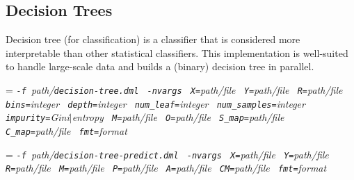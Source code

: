 \begin{comment}

 Licensed to the Apache Software Foundation (ASF) under one
 or more contributor license agreements.  See the NOTICE file
 distributed with this work for additional information
 regarding copyright ownership.  The ASF licenses this file
 to you under the Apache License, Version 2.0 (the
 "License"); you may not use this file except in compliance
 with the License.  You may obtain a copy of the License at

   http://www.apache.org/licenses/LICENSE-2.0

 Unless required by applicable law or agreed to in writing,
 software distributed under the License is distributed on an
 "AS IS" BASIS, WITHOUT WARRANTIES OR CONDITIONS OF ANY
 KIND, either express or implied.  See the License for the
 specific language governing permissions and limitations
 under the License.

\end{comment}

\subsection{Decision Trees}
\label{sec:decision_trees}

\smallskip


Decision tree (for classification) is a classifier that is considered
more interpretable than other statistical classifiers. This implementation
is well-suited to handle large-scale data and builds a (binary) decision 
tree in parallel.\\

\smallskip
{}
\smallskip

{\hangindent=\parindent\noindent\it%
	{\tt{}-f }path/\/{\tt{}decision-tree.dml}
	{\tt{} -nvargs}
	{\tt{} X=}path/file
	{\tt{} Y=}path/file
	{\tt{} R=}path/file
	{\tt{} bins=}integer
	{\tt{} depth=}integer
	{\tt{} num\_leaf=}integer
	{\tt{} num\_samples=}integer
	{\tt{} impurity=}Gini$\mid$entropy
	{\tt{} M=}path/file
	{\tt{} O=}path/file
	{\tt{} S\_map=}path/file
	{\tt{} C\_map=}path/file
	{\tt{} fmt=}format
	
}

 \smallskip
 \smallskip
 
 {\hangindent=\parindent\noindent\it%
 	{\tt{}-f }path/\/{\tt{}decision-tree-predict.dml}
 	{\tt{} -nvargs}
 	{\tt{} X=}path/file
 	{\tt{} Y=}path/file
 	{\tt{} R=}path/file
 	{\tt{} M=}path/file
 	{\tt{} P=}path/file
 	{\tt{} A=}path/file
 	{\tt{} CM=}path/file
 	{\tt{} fmt=}format
 	
 }\smallskip
 
